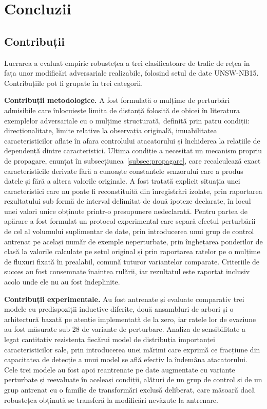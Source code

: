 \chapter{Concluzii}\label{ch:concluzii}
\pagestyle{fancy}

\section{Contribuții}\label{sec:contributii}

Lucrarea a evaluat empiric robustețea a trei clasificatoare de trafic de rețea în fața unor modificări adversariale realizabile, folosind setul de date UNSW-NB15. Contribuțiile pot fi grupate în trei categorii.

\textbf{Contribuții metodologice.} A fost formulată o mulțime de perturbări admisibile care înlocuiește limita de distanță folosită de obicei în literatura exemplelor adversariale cu o mulțime structurată, definită prin patru condiții: direcționalitate, limite relative la observația originală, imuabilitatea caracteristicilor aflate în afara controlului atacatorului și închiderea la relațiile de dependență dintre caracteristici. Ultima condiție a necesitat un mecanism propriu de propagare, enunțat în subsecțiunea~\ref{subsec:propagare}, care recalculează exact caracteristicile derivate fără a cunoaște constantele senzorului care a produs datele și fără a altera valorile originale. A fost tratată explicit situația unei caracteristici care nu poate fi reconstituită din înregistrări izolate, prin raportarea rezultatului sub formă de interval delimitat de două ipoteze declarate, în locul unei valori unice obținute printr-o presupunere nedeclarată. Pentru partea de apărare a fost formulat un protocol experimental care separă efectul perturbării de cel al volumului suplimentar de date, prin introducerea unui grup de control antrenat pe același număr de exemple neperturbate, prin înghețarea ponderilor de clasă la valorile calculate pe setul original și prin raportarea ratelor pe o mulțime de fluxuri fixată în prealabil, comună tuturor variantelor comparate. Criteriile de succes au fost consemnate înaintea rulării, iar rezultatul este raportat inclusiv acolo unde ele nu au fost îndeplinite.

\textbf{Contribuții experimentale.} Au fost antrenate și evaluate comparativ trei modele cu predispoziții inductive diferite, două ansambluri de arbori și o arhitectură bazată pe atenție implementată de la zero, iar ratele lor de evaziune au fost măsurate sub 28 de variante de perturbare. Analiza de sensibilitate a legat cantitativ rezistența fiecărui model de distribuția importanței caracteristicilor sale, prin introducerea unei mărimi care exprimă ce fracțiune din capacitatea de detecție a unui model se află efectiv la îndemâna atacatorului. Cele trei modele au fost apoi reantrenate pe date augmentate cu variante perturbate și reevaluate în aceleași condiții, alături de un grup de control și de un grup antrenat cu o familie de transformări exclusă deliberat, care măsoară dacă robustețea obținută se transferă la modificări nevăzute la antrenare.

